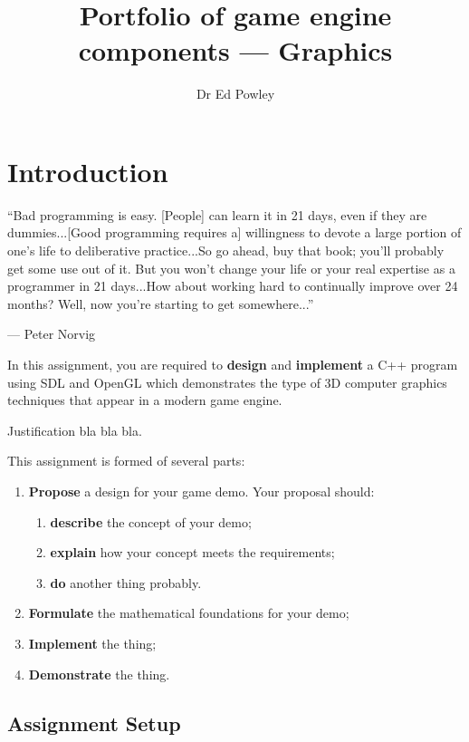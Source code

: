 \documentclass{../fal_assignment}
\title{Portfolio of game engine components --- Graphics}
\author{Dr Ed Powley}
\begin{document}
\maketitle

\section*{Introduction}

\begin{marginquote}
``Bad programming is easy. [People] can learn it in 21 days, even if they are dummies...[Good programming requires a] willingness to devote a large portion of one's life to deliberative practice...So go ahead, buy that book; you'll probably get some use out of it. But you won't change your life or your real expertise as a programmer in 21 days...How about working hard to continually improve over 24 months? Well, now you're starting to get somewhere...''
\par --- Peter Norvig
\end{marginquote}

In this assignment, you are required to \textbf{design} and \textbf{implement} a C++ program using SDL and OpenGL
which demonstrates the type of 3D computer graphics techniques that appear in a modern game engine.

Justification bla bla bla.

This assignment is formed of several parts:
\begin{enumerate}[label=(\Alph*)]
	\item \textbf{Propose} a design for your game demo. Your proposal should:
		\begin{enumerate}[label=(\roman*)]
			\item \textbf{describe} the concept of your demo;
			\item \textbf{explain} how your concept meets the requirements;
			\item \textbf{do} another thing probably.
		\end{enumerate}
	\item \textbf{Formulate} the mathematical foundations for your demo;
	\item \textbf{Implement} the thing;
	\item \textbf{Demonstrate} the thing.
\end{enumerate}

\subsection*{Assignment Setup}
\end{document}
